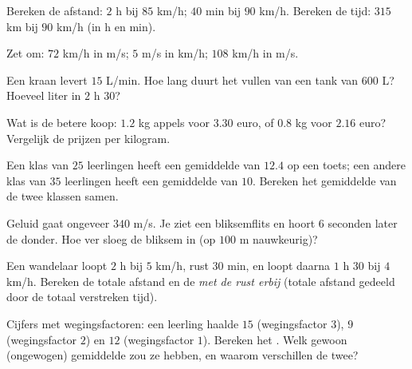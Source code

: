\begin{exercise}[$\star$]\label{exo:g8:speed:2}
Bereken de afstand: $2$ h bij $85$ km/h; $40$ min bij $90$ km/h. Bereken de tijd:
$315$ km bij $90$ km/h (in h en min).
\end{exercise}

\begin{exercise}[$\star$]\label{exo:g8:speed:3}
Zet om: $72$ km/h in m/s; $5$ m/s in km/h; $108$ km/h in m/s.
\end{exercise}

\begin{exercise}[$\star$]\label{exo:g8:speed:4}
Een kraan levert $15$ L/min. Hoe lang duurt het vullen van een tank van $600$ L?
Hoeveel liter in $2$ h $30$?
\end{exercise}

\begin{exercise}[$\star$]\label{exo:g8:speed:5}
Wat is de betere koop: $1.2$ kg appels voor $3.30$ euro, of $0.8$ kg voor $2.16$
euro? Vergelijk de prijzen per kilogram.
\end{exercise}

\begin{exercise}[$\star$]\label{exo:g8:speed:6}
Een klas van $25$ leerlingen heeft een gemiddelde van $12.4$ op een toets; een
andere klas van $35$ leerlingen heeft een gemiddelde van $10$. Bereken het
gemiddelde van de twee klassen samen.
\end{exercise}

\begin{exercise}[$\star$]\label{exo:g8:speed:7}
Geluid gaat ongeveer $340$ m/s. Je ziet een bliksemflits en hoort $6$ seconden
later de donder. Hoe ver sloeg de bliksem in (op $100$ m nauwkeurig)?
\end{exercise}

\begin{exercise}[$\star\star$]\label{exo:g8:speed:8}
Een wandelaar loopt $2$ h bij $5$ km/h, rust $30$ min, en loopt daarna
$1$ h $30$ bij $4$ km/h. Bereken de totale afstand en de 
\emph{met de rust erbij} (totale afstand gedeeld door de totaal verstreken tijd).
\end{exercise}

\begin{exercise}[$\star\star$]\label{exo:g8:speed:9}
Cijfers met wegingsfactoren: een leerling haalde $15$ (wegingsfactor $3$), $9$
(wegingsfactor $2$) en $12$ (wegingsfactor $1$). Bereken het .
Welk gewoon (ongewogen) gemiddelde zou ze hebben, en waarom verschillen de twee?
\end{exercise}


